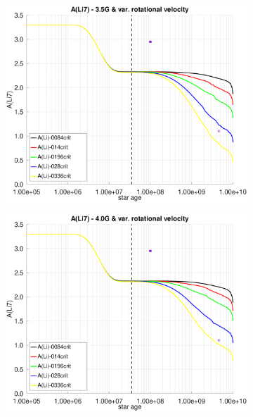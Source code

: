 \documentclass[fleqn,usenatbib]{mnras}
\begin{document}
\begin{figure}
\begin{subfigure}[h]{0.47\textwidth}
    \label{fig:subim2}
    \end{subfigure}
    \begin{subfigure}[h]{0.47\textwidth}
    \includegraphics[trim = 25mm 10mm 15mm 10mm, clip,width=\textwidth]{figures/li_var_vel_3_5g.eps}
    \label{fig:subim3}
    \end{subfigure}
    \begin{subfigure}[h]{0.47\textwidth}
    \includegraphics[trim = 25mm 10mm 15mm 10mm, clip,width=\textwidth]{figures/li_var_vel_4_0g.eps}
    \label{fig:subim4}
    \end{subfigure}

\end{figure}
\end{document}
